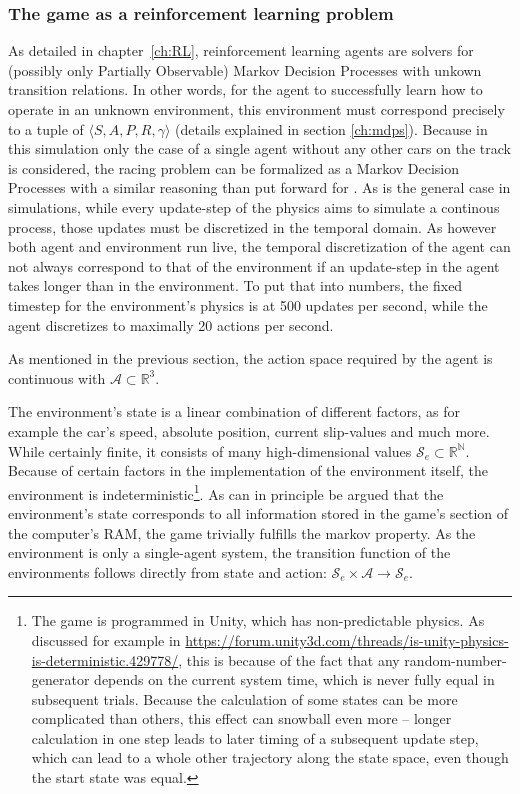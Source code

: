 \subsubsection{The game as a reinforcement learning problem}

As detailed in chapter~\ref{ch:RL}, reinforcement learning agents are solvers for (possibly only Partially Observable) Markov Decision Processes with unkown transition relations. In other words, for the agent to successfully learn how to operate in an unknown environment, this environment must correspond precisely to a tuple of $\langle S, A, P, R, \gamma \rangle$ (details explained in section \ref{ch:mdps}). Because in this simulation only the case of a single agent without any other cars on the track is considered, the racing problem can be formalized as a Markov Decision Processes with a similar reasoning than \citet[chapter 4]{wymann_torcs_2000} put forward for . As is the general case in simulations, while every update-step of the physics aims to simulate a continous process, those updates must be discretized in the temporal domain. As however both agent and environment run live, the temporal discretization of the agent can not always correspond to that of the environment if an update-step in the agent takes longer than in the environment. To put that into numbers, the fixed timestep for the environment's physics is at 500 updates per second, while the agent discretizes to maximally 20 actions per second.

As mentioned in the previous section, the action space required by the agent is continuous with $\mathcal{A} \subset \mathds{R}^3$. 

The environment's state is a linear combination of different factors, as for example the car's speed, absolute position, current slip-values and much more. While certainly finite, it consists of many high-dimensional values $\mathcal{S}_e \subset \mathds{R}^\mathds{N}$. Because of certain factors in the implementation of the environment itself, the environment is indeterministic\footnote{The game is programmed in Unity, which has non-predictable physics. As discussed for example in \url{https://forum.unity3d.com/threads/is-unity-physics-is-deterministic.429778/}, this is because of the fact that any random-number-generator depends on the current system time, which is never fully equal in subsequent trials. Because the calculation of some states can be more complicated than others, this effect can snowball even more -- longer calculation in one step leads to later timing of a subsequent update step, which can lead to a whole other trajectory along the state space, even though the start state was equal.}. As can in principle be argued that the environment's state corresponds to all information stored in the game's section of the computer's RAM, the game trivially fulfills the markov property. As the environment is only a single-agent system, the transition function of the environments follows directly from state and action: $\mathcal{S}_e \times \mathcal{A} \rightarrow \mathcal{S}_e$.

